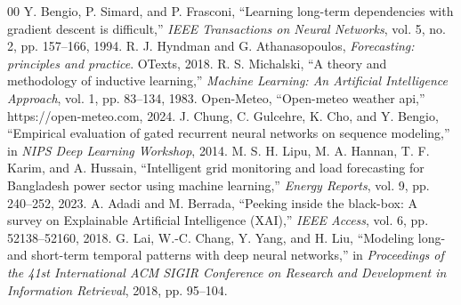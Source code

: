 \begin{thebibliography}{00}
 Y. Bengio, P. Simard, and P. Frasconi, ``Learning long-term dependencies with gradient descent is difficult,'' \textit{IEEE Transactions on Neural Networks}, vol. 5, no. 2, pp. 157--166, 1994.
 R. J. Hyndman and G. Athanasopoulos, \textit{Forecasting: principles and practice}. OTexts, 2018.
 R. S. Michalski, ``A theory and methodology of inductive learning,'' \textit{Machine Learning: An Artificial Intelligence Approach}, vol. 1, pp. 83--134, 1983.
 Open-Meteo, ``Open-meteo weather api,'' https://open-meteo.com, 2024.
 J. Chung, C. Gulcehre, K. Cho, and Y. Bengio, ``Empirical evaluation of gated recurrent neural networks on sequence modeling,'' in \textit{NIPS Deep Learning Workshop}, 2014.
 M. S. H. Lipu, M. A. Hannan, T. F. Karim, and A. Hussain, ``Intelligent grid monitoring and load forecasting for Bangladesh power sector using machine learning,'' \textit{Energy Reports}, vol. 9, pp. 240--252, 2023.
 A. Adadi and M. Berrada, ``Peeking inside the black-box: A survey on Explainable Artificial Intelligence (XAI),'' \textit{IEEE Access}, vol. 6, pp. 52138--52160, 2018.
 G. Lai, W.-C. Chang, Y. Yang, and H. Liu, ``Modeling long- and short-term temporal patterns with deep neural networks,'' in \textit{Proceedings of the 41st International ACM SIGIR Conference on Research and Development in Information Retrieval}, 2018, pp. 95--104.
\end{thebibliography}
